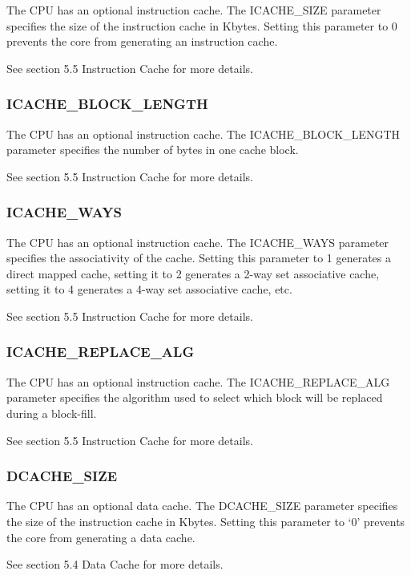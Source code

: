 The CPU has an optional instruction cache. The ICACHE\_SIZE parameter
specifies the size of the instruction cache in Kbytes. Setting this
parameter to 0 prevents the core from generating an instruction cache.

See section 5.5 Instruction Cache for more details.

\subsubsection{ICACHE\_BLOCK\_LENGTH}\label{icache_block_length}

The CPU has an optional instruction cache. The ICACHE\_BLOCK\_LENGTH
parameter specifies the number of bytes in one cache block.

See section 5.5 Instruction Cache for more details.

\subsubsection{ICACHE\_WAYS}\label{icache_ways}

The CPU has an optional instruction cache. The ICACHE\_WAYS parameter
specifies the associativity of the cache. Setting this parameter to 1
generates a direct mapped cache, setting it to 2 generates a 2-way set
associative cache, setting it to 4 generates a 4-way set associative
cache, etc.

See section 5.5 Instruction Cache for more details.

\subsubsection{ICACHE\_REPLACE\_ALG}\label{icache_replace_alg}

The CPU has an optional instruction cache. The ICACHE\_REPLACE\_ALG
parameter specifies the algorithm used to select which block will be
replaced during a block-fill.

See section 5.5 Instruction Cache for more details.

\subsubsection{DCACHE\_SIZE}\label{dcache_size}

The CPU has an optional data cache. The DCACHE\_SIZE parameter specifies
the size of the instruction cache in Kbytes. Setting this parameter to
`0' prevents the core from generating a data cache.

See section 5.4 Data Cache for more details.

